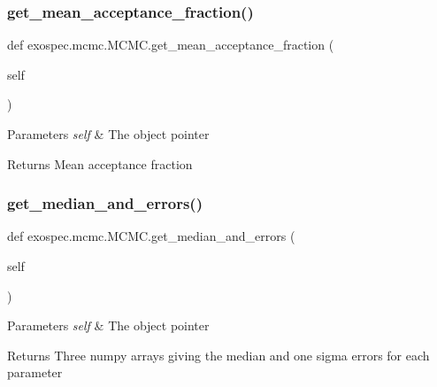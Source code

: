 \subsubsection{\texorpdfstring{get\+\_\+mean\+\_\+acceptance\+\_\+fraction()}{get\_mean\_acceptance\_fraction()}}
{\footnotesize\ttfamily def exospec.\+mcmc.\+M\+C\+M\+C.\+get\+\_\+mean\+\_\+acceptance\+\_\+fraction (\begin{DoxyParamCaption}\item[{}]{self }\end{DoxyParamCaption})}


\begin{DoxyParams}{Parameters}
{\em self} & The object pointer \\
\hline
\end{DoxyParams}
\begin{DoxyReturn}{Returns}
Mean acceptance fraction 
\end{DoxyReturn}
\mbox{\label{classexospec_1_1mcmc_1_1_m_c_m_c_a7fe8d9326590fe7cc875fa5118eaa617}} 
\subsubsection{\texorpdfstring{get\+\_\+median\+\_\+and\+\_\+errors()}{get\_median\_and\_errors()}}
{\footnotesize\ttfamily def exospec.\+mcmc.\+M\+C\+M\+C.\+get\+\_\+median\+\_\+and\+\_\+errors (\begin{DoxyParamCaption}\item[{}]{self }\end{DoxyParamCaption})}


\begin{DoxyParams}{Parameters}
{\em self} & The object pointer \\
\hline
\end{DoxyParams}
\begin{DoxyReturn}{Returns}
Three numpy arrays giving the median and one sigma errors for each parameter 
\end{DoxyReturn}
\mbox{\label{classexospec_1_1mcmc_1_1_m_c_m_c_ab2c5cc870e2b384534404f3bc667e039}} 
